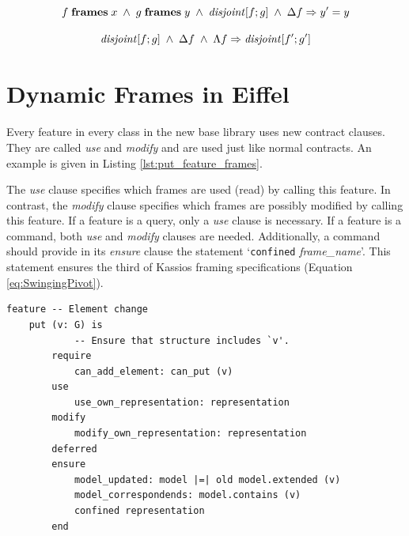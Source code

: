\begin{equation}
	f \; \text{\bf{frames}} \; x  \; \wedge \; g \; \text{\bf{frames}} \; y \; \wedge \; \text{\textit{disjoint}} [f;g] \; \wedge \; \Delta f \Rightarrow y' = y
	\label{eq:Disjoint}
\end{equation}

\begin{equation}
	\text{\textit{disjoint}} [f;g] \; \wedge \; \Delta f \; \wedge \; \Lambda f \Rightarrow \text{\textit{disjoint}} [f';g']
	\label{eq:Disjoint2}
\end{equation}

\section{Dynamic Frames in Eiffel}
\label{sec:DynamicFramesInEiffel}

Every feature in every class in the new base library uses new contract clauses. They are called \emph{use} and \emph{modify} and are used just like normal contracts. An example is given in Listing \ref{lst:put_feature_frames}.

The \emph{use} clause specifies which frames are used (read) by calling this feature. In contrast, the \emph{modify} clause specifies which frames are possibly modified by calling this feature. If a feature is a query, only a \emph{use} clause is necessary. If a feature is a command, both \emph{use} and \emph{modify} clauses are needed. Additionally, a command should provide in its \emph{ensure} clause the statement `\lstinline!confined! \emph{frame\_name}'. This statement ensures the third of Kassios framing specifications (Equation \ref{eq:SwingingPivot}).

\begin{lstlisting}[float,caption=put feature of the CC\_COLLECTION class.,label=lst:put_feature_frames]
feature -- Element change
	put (v: G) is
			-- Ensure that structure includes `v'.
		require
			can_add_element: can_put (v)
		use
			use_own_representation: representation
		modify
			modify_own_representation: representation
		deferred
		ensure
			model_updated: model |=| old model.extended (v)
			model_correspondends: model.contains (v)
			confined representation
		end
\end{lstlisting}
